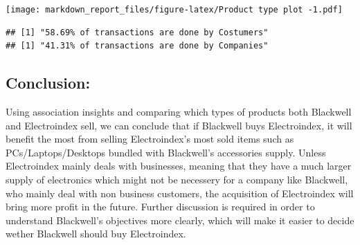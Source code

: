 \documentclass[]{article}
\begin{document}
\texttt{[image: markdown\_report\_files/figure-latex/Product type plot -1.pdf]}

\begin{verbatim}
## [1] "58.69% of transactions are done by Costumers"
## [1] "41.31% of transactions are done by Companies"
\end{verbatim}

\subsection{Conclusion:}\label{conclusion}

Using association insights and comparing which types of products both
Blackwell and Electroindex sell, we can conclude that if Blackwell buys
Electroindex, it will benefit the most from selling Electroindex's most
sold items such as PCs/Laptops/Desktops bundled with Blackwell's
accessories supply. Unless Electroindex mainly deals with businesses,
meaning that they have a much larger supply of electronics which might
not be necessery for a company like Blackwell, who mainly deal with non
business customers, the acquisition of Electroindex will bring more
profit in the future. Further discussion is required in order to
understand Blackwell's objectives more clearly, which will make it
easier to decide wether Blackwell should buy Electroindex.
\end{document}
